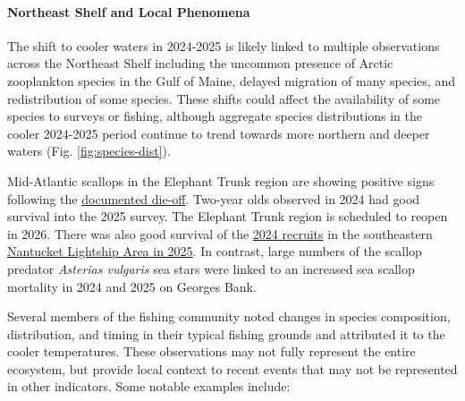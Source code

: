 \documentclass[
  10pt,
]{article}
\begin{document}
\paragraph{Northeast Shelf and Local Phenomena}\label{northeast-shelf-and-local-phenomena}

The shift to cooler waters in 2024-2025 is likely linked to multiple observations across the Northeast Shelf including the uncommon presence of Arctic zooplankton species in the Gulf of Maine, delayed migration of many species, and redistribution of some species. These shifts could affect the availability of some species to surveys or fishing, although aggregate species distributions in the cooler 2024-2025 period continue to trend towards more northern and deeper waters (Fig. \ref{fig:species-dist}).

Mid-Atlantic scallops in the Elephant Trunk region are showing positive signs following the \href{https://noaa-edab.github.io/catalog/observation_synthesis_2023.html}{documented die-off}. Two-year olds observed in 2024 had good survival into the 2025 survey. The Elephant Trunk region is scheduled to reopen in 2026. There was also good survival of the \href{https://noaa-edab.github.io/catalog/observation_synthesis_2024.html}{2024 recruits} in the southeastern \href{https://noaa-edab.github.io/catalog/observation_synthesis_2025.html}{Nantucket Lightship Area in 2025}. In contrast, large numbers of the scallop predator \emph{Asterias vulgaris} sea stars were linked to an increased sea scallop mortality in 2024 and 2025 on Georges Bank.

Several members of the fishing community noted changes in species composition, distribution, and timing in their typical fishing grounds and attributed it to the cooler temperatures. These observations may not fully represent the entire ecosystem, but provide local context to recent events that may not be represented in other indicators. Some notable examples include:
\end{document}
